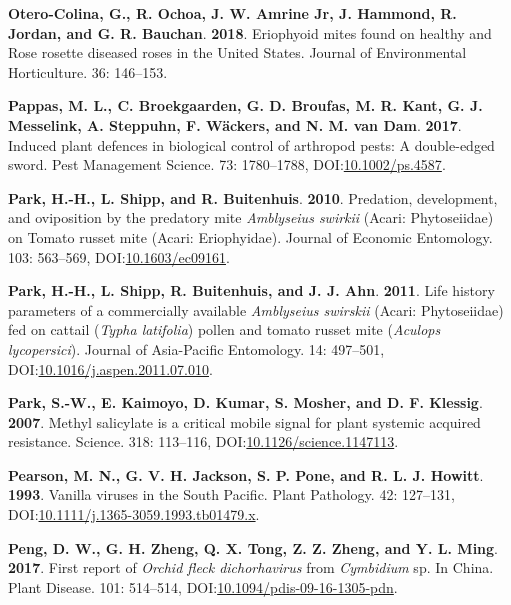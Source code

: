 \documentclass[12pt,final,CPage]{ufthesis}
\newlength{\cslhangindent}
\newenvironment{CSLReferences}[2] %
{%
	\setlength{\parindent}{0pt}
	\ifodd #1 \everypar{\setlength{\hangindent}{\cslhangindent}}\ignorespaces\fi
	\ifnum #2 > 0
	\setlength{\parskip}{#2\baselineskip}
	\fi
}%
{}
\begin{document}
{\begin{CSLReferences}{1}{0}
  \leavevmode{}%
  \textbf{Otero-Colina, G., R. Ochoa, J. W. Amrine Jr, J. Hammond, R. Jordan, and G. R. Bauchan}. \textbf{2018}. Eriophyoid mites found on healthy and {Rose rosette diseased} roses in the {United States}. Journal of Environmental Horticulture. 36: 146--153.

  \leavevmode{}%
  \textbf{Pappas, M. L., C. Broekgaarden, G. D. Broufas, M. R. Kant, G. J. Messelink, A. Steppuhn, F. Wäckers, and N. M. van Dam}. \textbf{2017}. Induced plant defences in biological control of arthropod pests: A double-edged sword. Pest Management Science. 73: 1780--1788, DOI:\href{https://doi.org/10.1002/ps.4587}{10.1002/ps.4587}.

  \leavevmode{}%
  \textbf{Park, H.-H., L. Shipp, and R. Buitenhuis}. \textbf{2010}. Predation, development, and oviposition by the predatory mite {\emph{Amblyseius swirkii}} ({Acari}: {Phytoseiidae}) on {Tomato russet mite} ({Acari}: {Eriophyidae}). Journal of Economic Entomology. 103: 563--569, DOI:\href{https://doi.org/10.1603/ec09161}{10.1603/ec09161}.

  \leavevmode{}%
  \textbf{Park, H.-H., L. Shipp, R. Buitenhuis, and J. J. Ahn}. \textbf{2011}. Life history parameters of a commercially available {\emph{Amblyseius swirskii}} ({Acari}: {Phytoseiidae}) fed on cattail ({\emph{Typha latifolia}}) pollen and tomato russet mite ({\emph{Aculops lycopersici}}). Journal of Asia-Pacific Entomology. 14: 497--501, DOI:\href{https://doi.org/10.1016/j.aspen.2011.07.010}{10.1016/j.aspen.2011.07.010}.

  \leavevmode{}%
  \textbf{Park, S.-W., E. Kaimoyo, D. Kumar, S. Mosher, and D. F. Klessig}. \textbf{2007}. Methyl salicylate is a critical mobile signal for plant systemic acquired resistance. Science. 318: 113--116, DOI:\href{https://doi.org/10.1126/science.1147113}{10.1126/science.1147113}.

  \leavevmode{}%
  \textbf{Pearson, M. N., G. V. H. Jackson, S. P. Pone, and R. L. J. Howitt}. \textbf{1993}. Vanilla viruses in the {South Pacific}. Plant Pathology. 42: 127--131, DOI:\href{https://doi.org/10.1111/j.1365-3059.1993.tb01479.x}{10.1111/j.1365-3059.1993.tb01479.x}.

  \leavevmode{}%
  \textbf{Peng, D. W., G. H. Zheng, Q. X. Tong, Z. Z. Zheng, and Y. L. Ming}. \textbf{2017}. First report of {\emph{Orchid fleck dichorhavirus}} from {\emph{Cymbidium}} sp. In {China}. Plant Disease. 101: 514--514, DOI:\href{https://doi.org/10.1094/pdis-09-16-1305-pdn}{10.1094/pdis-09-16-1305-pdn}.


\end{CSLReferences}}
\end{document}
